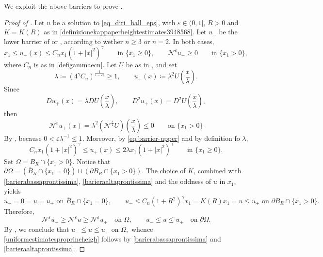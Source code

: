 \documentclass[11pt]{amsart}
\renewcommand{\leq}{\leqslant}
\renewcommand{\geq}{\geqslant}
\renewcommand{\le}{<}
\renewcommand{\ge}{>}
\newcommand{\Om}{\Omega}
\newcommand{\eps}{\varepsilon}
\newcommand{\Ne}{\mathcal N^\eps}
\theoremstyle{definition}
\theoremstyle{remark}
\numberwithin{equation}{section}
\begin{document}
We exploit the above barriers to prove .
\begin{proof}[Proof of ]
Let $u$ be a solution to \eqref{eq_diri_ball_eps}, with $\eps\in(0,1]$, $R\ge 0$ and $K=K(R)$ as in \eqref{definizionekappaperheightestimates3948568}. Let $u_-$ be the lower barrier of  or
, according to wether $n\geq 3$ or $n=2$. In both cases,
\begin{equation}\label{barierabassaprontissima}
    x_1\leq u_-(x)\leq C_nx_1(1+|x|^2)^\gamma
 \qquad\text{in }\{x_1\geq 0\},\qquad \Ne u_-\geq0\qquad\text{in }\{x_1\ge 0\}, 
\end{equation}
where $C_n$ is as in \eqref{defigammaecn}.
Let $U$ be as in , and set
\[
 \lambda\coloneqq(4^\gamma C_n)^{\frac{1}{1-2\gamma}}\geq1,
 \qquad u_+(x)\coloneqq\lambda^2U\left(\frac x\lambda\right).
\]
Since
\begin{equation*}
    Du_+(x)=\lambda DU\left(\frac x\lambda\right),\qquad D^2u_+(x)=D^2U\left(\frac x\lambda\right),
\end{equation*} 
then
\begin{equation}\label{eq:barrier-dilation}
 \Ne u_+(x)=\lambda^2
       \left(\mathcal N^{\frac\eps\lambda}U\right)\left(\frac x\lambda\right)\leq0
       \qquad\text{on }\{x_1\ge 0\}
\end{equation}
By , because $0\le \eps\lambda^{-1}\leq 1$.
Moreover, by
\eqref{eq:barrier-upper} and by definition fo $\lambda$,
\begin{equation}\label{barieraaltaprontissima}
    C_nx_1(1+|x|^2)^\gamma
 \leq u_+(x)\leq2\lambda x_1(1+|x|^2)^\gamma
 \qquad\text{in }\{x_1\geq 0\}.
\end{equation}
Set $\Om=B_R\cap \{x_1\ge 0\}$. Notice that $\partial\Om=\left(\overline B_R\cap\{x_1=0\}\right)\cup\left(\partial B_R\cap \{x_1\ge 0\}\right)$. The choice of $K$, combined with \eqref{barierabassaprontissima}, \eqref{barieraaltaprontissima} and the oddness of $u$ in $x_1$, yields
\[
 u_-=0=u=u_+\text{ on }\overline B_R\cap\{x_1=0\},\qquad u_-\leq C_n(1+R^2)^\gamma x_1=K(R)x_1=u\leq u_+\text{ on }\partial B_R\cap \{x_1\ge 0\}.
\]
Therefore,
\begin{equation*}
    \Ne u_-\geq\Ne u\geq \Ne u_+\quad\text{on }\Om,\qquad u_-\leq u\leq u_+\quad\text{on }\partial\Om.
\end{equation*}
By
,  we conclude that $u_-\leq u\leq u_+ \text{ on }\Om,$ whence \eqref{uniformestimatesproprincheigh} follows by \eqref{barierabassaprontissima} and  \eqref{barieraaltaprontissima}.
\end{proof}
\end{document}

